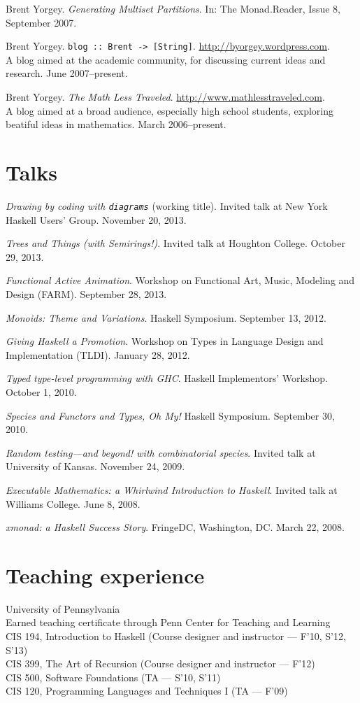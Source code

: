 \documentclass{article}
\newcommand{\cvitem}{\par\hangpara{2em}{1}}
\begin{document}
\cvitem Brent Yorgey. \emph{Generating Multiset Partitions}.  In: The
Monad.Reader, Issue 8, September 2007.

\cvitem Brent Yorgey. \texttt{blog :: Brent ->
  [String]}. \url{http://byorgey.wordpress.com}.  \\
A blog aimed at the academic community, for discussing current ideas
and research.  June 2007--present.

\cvitem Brent Yorgey. \emph{The Math Less
  Traveled}. \url{http://www.mathlesstraveled.com}. \\
A blog aimed at a broad audience, especially high school students,
exploring beatiful ideas in mathematics.  March 2006--present.

\section*{Talks}

\cvitem \emph{Drawing by coding with \texttt{diagrams}} (working title). Invited talk at New York Haskell
    Users' Group. November 20, 2013.
\cvitem \emph{Trees and Things (with Semirings!)}. Invited talk at Houghton
    College. October 29, 2013.
\cvitem \emph{Functional Active Animation}. Workshop on Functional
    Art, Music, Modeling and Design (FARM).  September 28, 2013.
\cvitem \emph{Monoids: Theme and Variations}. Haskell Symposium.
    September 13, 2012.
\cvitem \emph{Giving Haskell a Promotion}. Workshop on Types in
    Language Design and Implementation (TLDI). January 28, 2012.
\cvitem \emph{Typed type-level programming with GHC}. Haskell
    Implementors' Workshop. October 1, 2010.
\cvitem \emph{Species and Functors and Types, Oh My!} Haskell
    Symposium. September 30, 2010.
\cvitem \emph{Random testing---and beyond! with combinatorial
    species}. Invited talk at University of Kansas.  November 24, 2009.
\cvitem \emph{Executable Mathematics: a Whirlwind Introduction to
    Haskell}. Invited talk at Williams College.  June 8, 2008.
\cvitem \emph{xmonad: a Haskell Success Story}. FringeDC, Washington,
    DC. March 22, 2008.

\section*{Teaching experience}

\cvitem
University of Pennsylvania \\
Earned teaching certificate through Penn Center for Teaching and
Learning \\
CIS 194, Introduction to Haskell (Course designer and instructor ---
F'10, S'12, S'13) \\
CIS 399, The Art of Recursion (Course designer and instructor ---
F'12) \\
CIS 500, Software Foundations (TA --- S'10, S'11) \\
CIS 120, Programming Languages and Techniques I (TA --- F'09)
\end{document}
